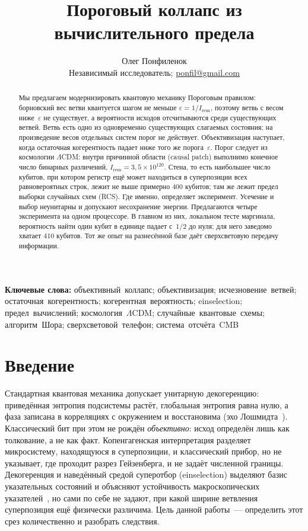 \documentclass[11pt,a4paper]{article}
\title{\textbf{Пороговый коллапс из вычислительного предела}}
\author{%
  Олег Понфиленок\\[0.35em]%
  {\normalsize Независимый исследователь; \href{mailto:ponfil@gmail.com}{ponfil@gmail.com}}%
}
\date{}
\newcommand{\Ost}{I_{\mathrm{rem}}}
\newcommand{\CollapseRuleI}{Пороговым правилом}
\begin{document}
\pagecolor{black}
\color{fg}

\maketitle

\begin{abstract}
Мы предлагаем модернизировать квантовую механику \CollapseRuleI{}: борновский вес ветви квантуется шагом не меньше $\varepsilon=1/\Ost$, поэтому ветвь с весом ниже~$\varepsilon$ не существует, а вероятности исходов отсчитываются среди существующих ветвей. Ветвь есть одно из одновременно существующих слагаемых состояния; на произведение весов отдельных систем порог не действует. Объективизация наступает, когда остаточная когерентность падает ниже того же порога~$\varepsilon$. Порог следует из космологии $\Lambda$CDM: внутри причинной области (causal patch) выполнимо конечное число бинарных различений, $\Ost=3{,}5\times 10^{120}$. Стена, то есть наибольшее число кубитов, при котором регистр ещё может находиться в суперпозиции всех равновероятных строк, лежит не выше примерно $400$ кубитов; там же лежит предел выборки случайных схем (RCS). Где именно, определяет эксперимент. Усечение и выбор неунитарны и допускают несохранение энергии. Предлагаются четыре эксперимента на одном процессоре. В главном из них, локальном тесте маргинала, вероятность найти один кубит в единице падает с~$1/2$ до нуля; для него заведомо хватает $410$ кубитов. Тот же опыт на разнесённой базе даёт сверхсветовую передачу информации.
\end{abstract}

\noindent\textbf{Ключевые слова:} объективный~коллапс; объективизация; исчезновение~ветвей; остаточная~когерентность; когерентная~вероятность; einselection; предел~вычислений; космология~$\Lambda$CDM; случайные~квантовые~схемы; алгоритм~Шора; сверхсветовой~телефон; система~отсчёта~CMB

\section{Введение}

Стандартная квантовая механика допускает унитарную декогеренцию: приведённая энтропия подсистемы растёт, глобальная энтропия равна нулю, а фаза записана в корреляциях с окружением и восстановима (эхо Лошмидта~\cite{swingle2018}). Классический бит при этом не рождён \emph{объективно}: исход определён лишь как толкование, а не как факт. Копенгагенская интерпретация разделяет микросистему, находящуюся в суперпозиции, и классический прибор, но не указывает, где проходит разрез Гейзенберга, и не задаёт численной границы. Декогеренция и наведённый средой суперотбор (einselection) выделяют базис указательных состояний и объясняют устойчивость макроскопических указателей~\cite{zurek2003}, но сами по себе не задают, при какой ширине ветвления суперпозиция ещё физически различима. Цель данной работы~--- определить этот срез количественно и разобрать следствия.
\end{document}
